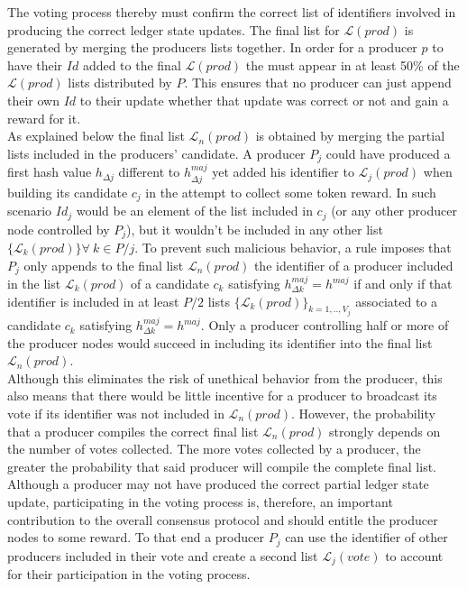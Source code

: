 The voting process thereby must confirm the correct list of identifiers involved in producing the correct ledger state updates. The final list for  $\mathcal{L}(prod)$ is generated by merging the producers lists together. In order for a producer $p$ to have their $Id$ added to the final  $\mathcal{L}(prod)$ the must appear in at least 50\% of the  $\mathcal{L}(prod)$ lists distributed by $P$. This ensures that no producer can just append their own $Id$ to their update whether that update was correct or not and gain a reward for it.  \\

As explained below the final list $\mathcal{L}_n(prod)$ is obtained by merging the partial lists included in the producers' candidate. A producer $P_j$ could have produced a first hash value $h_{\Delta j}$ different to $h^{maj}_{\Delta j}$ yet added his identifier to $\mathcal{L}_j(prod)$ when building its candidate $c_j$ in the attempt to collect some token reward. In such scenario $Id_j$ would be an element of the list included in $c_j$ (or any other producer node controlled by $P_j$), but it wouldn't be included in any other list $\{\mathcal{L}_k(prod)\} \forall~k \in P/j$. To prevent such malicious behavior, a rule imposes that $P_j$ only appends to the final list $\mathcal{L}_n(prod)$ the identifier of a producer included in the list $\mathcal{L}_k(prod)$ of a candidate $c_k$ satisfying $h^{maj}_{\Delta k} = h^{maj}$ if and only if that identifier is included in at least $P/2$ lists $\{\mathcal{L}_{k}(prod)\}_{k=1,..,V_j}$ associated to a candidate $c_{k}$ satisfying $h^{maj}_{\Delta k} = h^{maj}$. Only a producer controlling half or more of the producer nodes would succeed in including its identifier into the final list $\mathcal{L}_n(prod)$.\\

Although this eliminates the risk of unethical behavior from the producer, this also means that there would be little incentive for a producer to broadcast its vote if its identifier was not included in $\mathcal{L}_n(prod)$. However, the probability that a producer compiles the correct final list $\mathcal{L}_n(prod)$ strongly depends on the number of votes collected. The more votes collected by a producer, the greater the probability that said producer will compile the complete final list. Although a producer may not have produced the correct partial ledger state update, participating in the voting process is, therefore, an important contribution to the overall consensus protocol and should entitle the producer nodes to some reward. To that end a producer $P_j$ can use the identifier of other producers included in their vote and create a second list $\mathcal{L}_j(vote)$ to account for their participation in the voting process. \\

